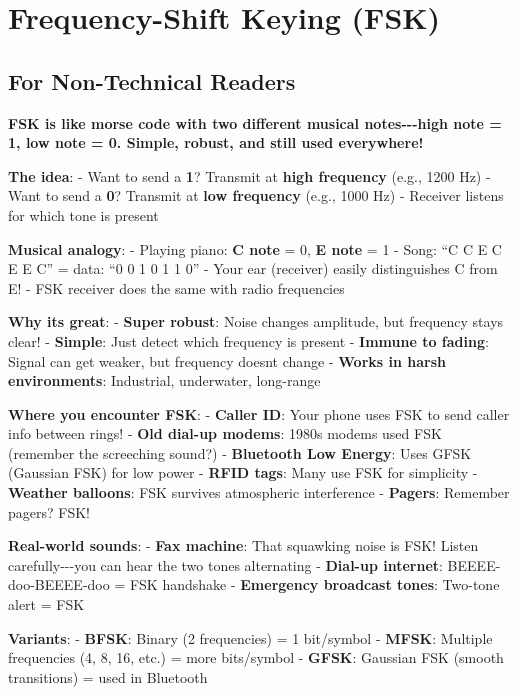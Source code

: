 \section{Frequency-Shift Keying (FSK)}\label{frequency-shift-keying-fsk}

\subsection{\texorpdfstring{ For Non-Technical
Readers}{ For Non-Technical Readers}}\label{for-non-technical-readers}

\textbf{FSK is like morse code with two different musical
notes-\/-\/-high note = 1, low note = 0. Simple, robust, and still used
everywhere!}

\textbf{The idea}: - Want to send a \textbf{1}? Transmit at \textbf{high
frequency} (e.g., 1200 Hz) - Want to send a \textbf{0}? Transmit at
\textbf{low frequency} (e.g., 1000 Hz) - Receiver listens for which tone
is present

\textbf{Musical analogy}: - Playing piano: \textbf{C note} = 0,
\textbf{E note} = 1 - Song: ``C C E C E E C'' = data: ``0 0 1 0 1 1 0''
- Your ear (receiver) easily distinguishes C from E! - FSK receiver does
the same with radio frequencies

\textbf{Why it\textquotesingle s great}: - \textbf{Super robust}: Noise
changes amplitude, but frequency stays clear! - \textbf{Simple}: Just
detect which frequency is present - \textbf{Immune to fading}: Signal
can get weaker, but frequency doesn\textquotesingle t change -
\textbf{Works in harsh environments}: Industrial, underwater, long-range

\textbf{Where you encounter FSK}: - \textbf{Caller ID}: Your phone uses
FSK to send caller info between rings! - \textbf{Old dial-up modems}:
1980s modems used FSK (remember the screeching sound?) -
\textbf{Bluetooth Low Energy}: Uses GFSK (Gaussian FSK) for low power -
\textbf{RFID tags}: Many use FSK for simplicity - \textbf{Weather
balloons}: FSK survives atmospheric interference - \textbf{Pagers}:
Remember pagers? FSK!

\textbf{Real-world sounds}: - \textbf{Fax machine}: That squawking noise
is FSK! Listen carefully-\/-\/-you can hear the two tones alternating -
\textbf{Dial-up internet}: BEEEE-doo-BEEEE-doo = FSK handshake -
\textbf{Emergency broadcast tones}: Two-tone alert = FSK

\textbf{Variants}: - \textbf{BFSK}: Binary (2 frequencies) = 1
bit/symbol - \textbf{MFSK}: Multiple frequencies (4, 8, 16, etc.) = more
bits/symbol - \textbf{GFSK}: Gaussian FSK (smooth transitions) = used in
Bluetooth

